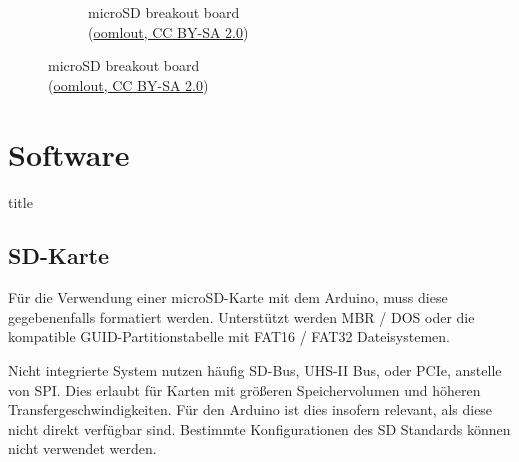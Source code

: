 \documentclass[ngerman]{schoolPres}
\newcommand{\FramedSection}[1]{
  \section{{#1}}%
  \begin{frame}%
    \vfill\begin{beamercolorbox}[sep=12pt, center]{title}%
      \usebeamerfont{title}{#1}\par%
    \end{beamercolorbox}\vfill%
  \end{frame}%
}
\begin{document}
\begin{frame}
\begin{figure}[!ht]
\begin{subfigure}{.3\linewidth}
        \caption{\tiny microSD breakout board\\(\href{https://www.flickr.com/photos/snazzyguy/6234676208/}{oomlout, CC BY-SA 2.0})}
      \end{subfigure}
    \end{figure}

  \end{frame}

  \FramedSection{Software}%
  \subsection{SD-Karte}%
  \begin{frame}
    Für die Verwendung einer microSD-Karte mit dem Arduino, muss diese gegebenenfalls formatiert werden.
    Unterstützt werden MBR / DOS oder die kompatible GUID-Partitionstabelle mit FAT16 / FAT32 Dateisystemen\cite{sd-lib}.

    \vspace{2em}

    Nicht integrierte System nutzen häufig SD-Bus, UHS-II Bus, oder PCIe, anstelle von SPI.
    Dies erlaubt für Karten mit größeren Speichervolumen und höheren Transfergeschwindigkeiten.
    Für den Arduino ist dies insofern relevant, als diese nicht direkt verfügbar sind.
    Bestimmte Konfigurationen des SD Standards können nicht verwendet werden\cite{sd-spec_physical-layer}.

  \end{frame}
\end{document}
